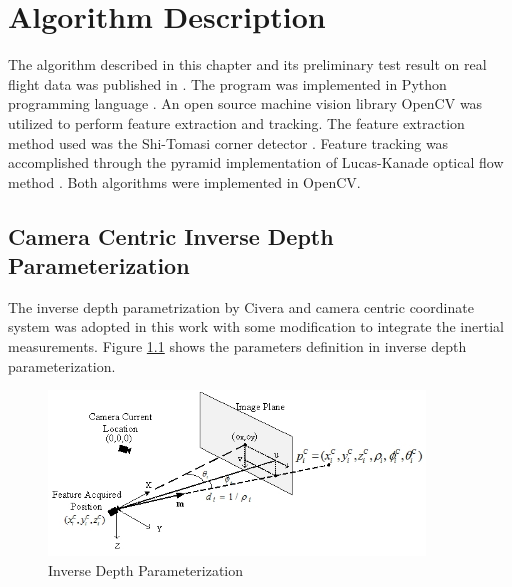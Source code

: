 \chapter{Algorithm Description}\label{ch:algorithm}

The algorithm described in this chapter and its preliminary test
result on real flight data was published in
\cite{zhang_obstacle_2012}. The program was implemented in Python
programming language \cite{_python_????}. An open source machine
vision library OpenCV was utilized to perform feature extraction and
tracking. The feature extraction method used was the Shi-Tomasi corner
detector \cite{shi_good_1994}. Feature tracking was accomplished
through the pyramid implementation of Lucas-Kanade optical flow method
\cite{bouguet_pyramidal_1999}. Both algorithms were implemented in
OpenCV. 

\section{Camera Centric Inverse Depth Parameterization}
The inverse depth parametrization by Civera \cite{civera_inverse_2008}
and camera centric coordinate system was adopted in this work with
some modification to integrate the inertial measurements. Figure
\ref{fig:algo1} shows the parameters definition in inverse depth
parameterization.

\begin{figure}[h]
\centering
\includegraphics[width=10cm, keepaspectratio=true]{./Figures/idp.jpg}
\caption{Inverse Depth Parameterization}
\label{fig:algo1}
\end{figure}

